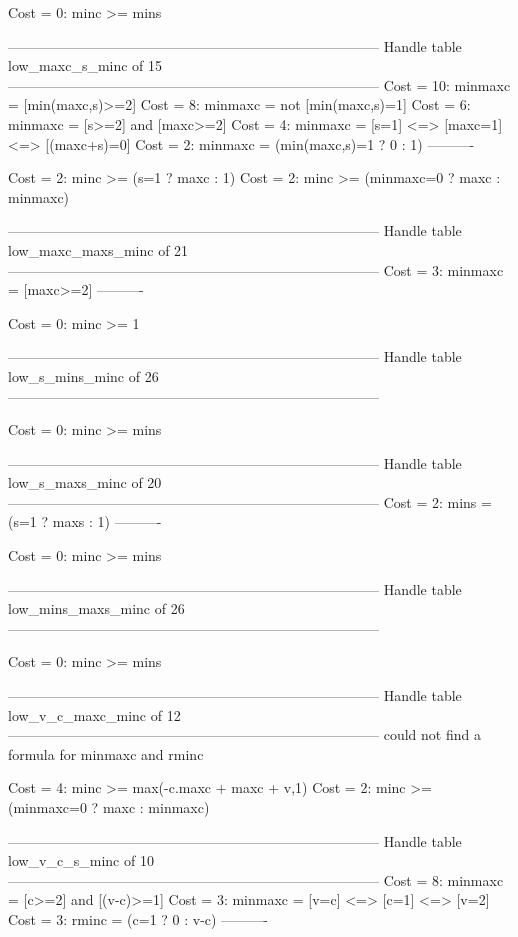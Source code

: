 Cost =  0:  minc >= mins

--------------------------------------------------------------------------------
Handle table low_maxc_s_minc of 15
--------------------------------------------------------------------------------
Cost = 10:  minmaxc = [min(maxc,s)>=2]
Cost =  8:  minmaxc = not [min(maxc,s)=1]
Cost =  6:  minmaxc = [s>=2] and [maxc>=2]
Cost =  4:  minmaxc = [s=1] <=> [maxc=1] <=> [(maxc+s)=0]
Cost =  2:  minmaxc = (min(maxc,s)=1 ? 0 : 1)
----------

Cost =  2:  minc >= (s=1 ? maxc : 1)
Cost =  2:  minc >= (minmaxc=0 ? maxc : minmaxc)

--------------------------------------------------------------------------------
Handle table low_maxc_maxs_minc of 21
--------------------------------------------------------------------------------
Cost =  3:  minmaxc = [maxc>=2]
----------

Cost =  0:  minc >= 1

--------------------------------------------------------------------------------
Handle table low_s_mins_minc of 26
--------------------------------------------------------------------------------

Cost =  0:  minc >= mins

--------------------------------------------------------------------------------
Handle table low_s_maxs_minc of 20
--------------------------------------------------------------------------------
Cost =  2:  mins = (s=1 ? maxs : 1)
----------

Cost =  0:  minc >= mins

--------------------------------------------------------------------------------
Handle table low_mins_maxs_minc of 26
--------------------------------------------------------------------------------

Cost =  0:  minc >= mins

--------------------------------------------------------------------------------
Handle table low_v_c_maxc_minc of 12
--------------------------------------------------------------------------------
could not find a formula for minmaxc and rminc

Cost =  4:  minc >= max(-c.maxc + maxc + v,1)
Cost =  2:  minc >= (minmaxc=0 ? maxc : minmaxc)

--------------------------------------------------------------------------------
Handle table low_v_c_s_minc of 10
--------------------------------------------------------------------------------
Cost =  8:  minmaxc = [c>=2] and [(v-c)>=1]
Cost =  3:  minmaxc = [v=c] <=> [c=1] <=> [v=2]
Cost =  3:  rminc   = (c=1 ? 0 : v-c)
----------

